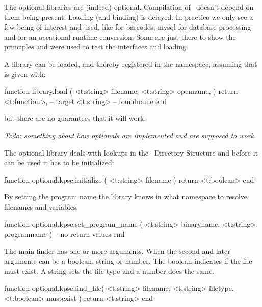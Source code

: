 \stopsubsection

\stopsection

\startsection[title={Optional}]

\startsubsection[title=Loading]

The optional libraries are (indeed) optional. Compilation of \LUAMETATEX\ doesn't
depend on them being present. Loading (and binding) is delayed. In practice we
only see a few being of interest and used, like  for barcodes, \type
{mysql} for database processing and  for an occasional
runtime conversion. Some are just there to show the principles and were used to
test the interfaces and loading.

A library can be loaded, and thereby registered in the 
namespace, assuming that  is given with:

\starttyping[option=LUA]
function library.load (
    <t:string> filename,
    <t:string> openname,
)
    return
        <t:function>, -- target
        <t:string>    -- foundname
end
\stoptyping

but there are no guarantees that it will work.

\stopsubsection

\startsubsection[title=Management]

{\em Todo: something about how optionals are implemented and are supposed to work.}

\stopsubsection

\startsubsection[title=TDS (kpse)]

The optional  library deals with lookups in the \TEX\ Directory
Structure and before it can be used it has to be initialized:

\starttyping[option=LUA]
function optional.kpse.initialize ( <t:string> filename )
    return <t:boolean>
end
\stoptyping

By setting the program name the library knows in what namespace to resolve
filenames and variables.

\starttyping[option=LUA]
function optional.kpse.set_program_name (
    <t:string> binaryname,
    <t:string> programname
)
    -- no return values
end
\stoptyping

The main finder has one or more arguments. When the second and later arguments
can be a boolean, string or number. The boolean indicates if the file must exist.
A string sets the file type and a number does the same.

\starttyping[option=LUA]
function optional.kpse.find_file(
    <t:string>  filename,
    <t:string>  filetype.
    <t:boolean> mustexist
)
    return <t:string>
end
\stoptyping


